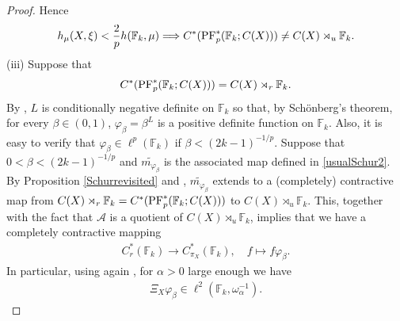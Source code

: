 \documentclass[12pt]{amsart}
\theoremstyle{definition}
\theoremstyle{remark}
\numberwithin{equation}{section}
\newcommand{\F}{\mathbb{F}}
\newcommand{\om}{\omega}
\begin{document}
\begin{proof}
Hence
\begin{align}\label{Eq:1}
   h_\mu(X,\xi)<\frac{2}{p} h(\F_k,\mu)   \Longrightarrow C^*(\textup{PF}^*_p(\F_k;C(X))) \neq C(X)\rtimes_u \F_k.
\end{align}
(iii) Suppose that $$C^*(\textup{PF}^*_p(\F_k;C(X))) = C(X)\rtimes_r \F_k.$$ By \cite{Haag}, $L$ is conditionally negative definite on $\F_k$ so that, by Sch\"onberg's theorem, for every $\beta\in (0,1)$, $\varphi_\beta=\beta^L$ is a positive definite function on $\F_k$. Also, it is easy to verify that $\varphi_\beta\in \ell^p(\F_k)$ if $\beta <(2k-1)^{-1/p}$. Suppose that $0<\beta <(2k-1)^{-1/p}$ and $\widetilde{m_{\varphi_\beta}}$ is the associated map defined in \eqref{usualSchur2}. By Proposition \ref{Schurrevisited} and \cite[Theorem 5.11]{SW2}, $\widetilde{m_{\varphi_\beta}}$  extends to a (completely) contractive map from $C(X)\rtimes_r \F_k=C^*(\textup{PF}^*_p(\F_k;C(X)))$ to $C(X)\rtimes_u \F_k$. This, together with the fact that $\mathcal{A}$ is a quotient of $C(X)\rtimes_u \F_k$, implies that we have a completely contractive mapping
\begin{align*}
    C^*_r(\F_k) \to C^*_{\pi_X}(\F_k),\quad f\mapsto f\varphi_\beta.
\end{align*}
In particular, using again \cite[Theorem 5.11]{SW2}, for $\alpha>0$ large enough we have
\begin{align*}
    \Xi_X \varphi_\beta \in \ell^2(\F_k,\om_\alpha^{-1}).
\end{align*}



\end{proof}
\end{document}
